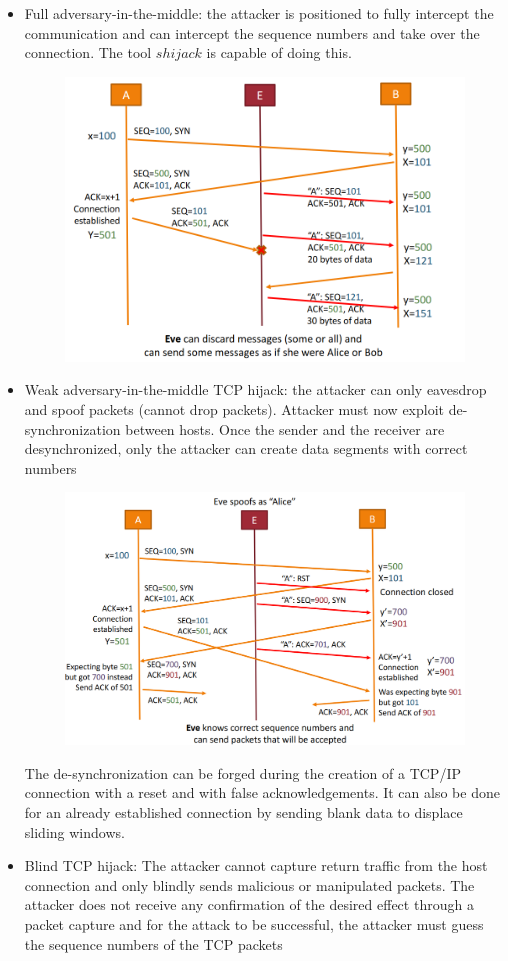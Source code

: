 \documentclass[10pt,a4paper]{report}
\begin{document}
\begin{itemize}
\item Full adversary-in-the-middle: the attacker is positioned to fully intercept the communication and  can intercept the sequence numbers and take over the connection. The tool $shijack$ is capable of doing this.
\begin{figure}[H]
\centering
\includegraphics[scale=0.45]{10.png}
\end{figure}
\item Weak adversary-in-the-middle TCP hijack: the attacker can only eavesdrop and spoof packets (cannot drop packets). Attacker must now exploit de-synchronization between hosts. Once the sender and the receiver are desynchronized, only the attacker can create data segments with correct numbers
\begin{figure}[H]
\centering
\includegraphics[scale=0.45]{11.png}
\end{figure}
The de-synchronization can be forged during the
creation of a TCP/IP connection with a reset and with false acknowledgements. It can also be done for an already established connection by sending blank data to displace sliding windows.
\item Blind TCP hijack: The attacker cannot capture return traffic from the host connection and only blindly sends malicious or manipulated packets. The attacker does not receive any confirmation of the desired effect through a packet capture and for  the attack to be successful, the attacker must guess the sequence numbers of the TCP packets
\end{itemize}
\end{document}
